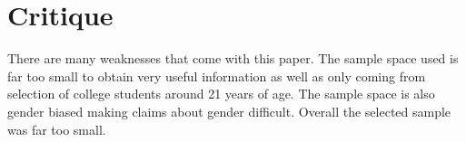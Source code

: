 \documentclass{article}
\begin{document}
\section*{Critique}
There are many weaknesses that come with this paper. The sample space used is far too small to obtain very useful information as well as only coming from selection of college students around 21 years of age. The sample space is also gender biased making claims about gender difficult. Overall the selected sample was far too small.
\cite{Mutlu06perceptionsof}
\end{document}
